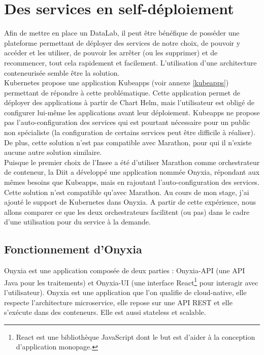 \documentclass[11pt,fleqn]{book} %
\begin{document}
\chapter{Des services en self-déploiement}
\vspace{-2cm}
Afin de mettre en place un DataLab, il peut être bénéfique de posséder une plateforme permettant de déployer des services de notre choix, de pouvoir y accéder et les utiliser, de pouvoir les arrêter (ou les supprimer) et de recommencer, tout cela rapidement et facilement. L'utilisation d'une architecture conteneurisée semble être la solution.\\

Kubernetes propose une application Kubeapps (voir annexe \ref{kubeapps}) permettant de répondre à cette problématique. Cette application permet de déployer des applications à partir de Chart Helm, mais l'utilisateur est obligé de configurer lui-même les applications avant leur déploiement. Kubeapps ne propose pas l'auto-configuration des services qui est pourtant nécessaire pour un public non spécialiste (la configuration de certains services peut être difficile à réaliser). De plus, cette solution n'est pas compatible avec Marathon, pour qui il n'existe aucune autre solution similaire.\\

Puisque le premier choix de l'Insee a été d'utiliser Marathon comme orchestrateur de conteneur, la Diit a développé une application nommée Onyxia, répondant aux mêmes besoins que Kubeapps, mais en rajoutant l'auto-configuration des services. Cette solution n'est compatible qu'avec Marathon. Au cours de mon stage, j'ai ajouté le support de Kubernetes dans Onyxia. A partir de cette expérience, nous allons comparer ce que les deux orchestrateurs facilitent (ou pas) dans le cadre d'une utilisation pour du service à la demande.

\section{Fonctionnement d'Onyxia}
Onyxia est une application composée de deux parties : Onyxia-API (une API Java pour les traitements) et Onyxia-UI (une interface React\footnote{React est une bibliothèque JavaScript dont le but est d'aider à la conception d'application monopage.} pour interagir avec l'utilisateur). Onyxia est une application que l'on qualifie de cloud-native, elle respecte l'architecture microservice, elle repose sur une API REST et elle s'exécute dans des conteneurs. Elle est aussi stateless et scalable.\\
\end{document}
